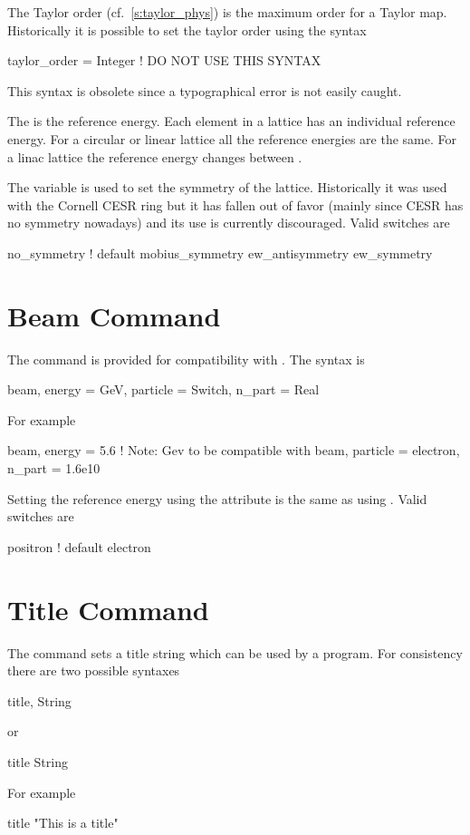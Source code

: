 The Taylor order (cf.~\ref{s:taylor_phys}) is the maximum order for a Taylor map.
Historically it is possible to set the taylor order using the syntax
\begin{example}
  taylor_order = Integer   ! DO NOT USE THIS SYNTAX
\end{example}
This syntax is obsolete since a typographical error is not easily caught.

The  is the reference energy.  Each element in a lattice 
has an individual reference energy. For a circular or linear lattice all 
the reference energies are the same. For a linac lattice
the reference energy changes between .

The  variable is used to set the symmetry of the lattice.
Historically it was used with the Cornell CESR ring but it has fallen 
out of favor (mainly since CESR has no symmetry nowadays) and its use
is currently discouraged. Valid  switches are
\begin{example}
  no\_symmetry         ! default
  mobius\_symmetry
  ew\_antisymmetry
  ew\_symmetry
\end{example}


\section{Beam Command}

The  command is provided for compatibility with \mad. The syntax is
\begin{example}
  beam, energy = GeV, particle = Switch, n_part = Real
\end{example}
For example
\begin{example}
  beam, energy = 5.6  ! Note: Gev to be compatible with \mad
  beam, particle = electron, n_part = 1.6e10
\end{example}
Setting the reference energy using the  attribute is the same
as using . Valid 
switches are
\begin{example}
  positron  ! default
  electron
\end{example}

\section{Title Command}
The  command sets a title string which can be used by a program. 
For consistency there are two possible syntaxes
\begin{example}
  title, String
\end{example}
or
\begin{example}
  title
  String
\end{example}
For example
\begin{example}
  title
  "This is a title"
\end{example}

